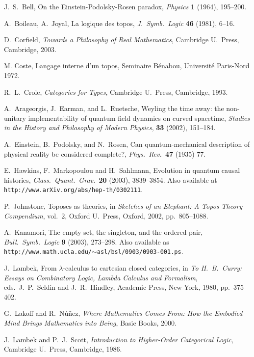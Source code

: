 \documentclass{article}
\begin{document}
\begin{thebibliography}{99}
 J.\ S.\ Bell, On the Einstein-Podolsky-Rosen 
paradox, {\sl Physics} {\bf 1} (1964), 195--200.

 A.\ Boileau, A.\ Joyal, La logique des topos,
{\sl J.\ Symb.\ Logic} {\bf 46} (1981), 6--16.

 D.\ Corfield, {\sl Towards a Philosophy of
Real Mathematics}, Cambridge U.\ Press, Cambridge, 2003.

 M. Coste, Langage interne d'un topos, 
Seminaire B\'enabou, Universit\'e Paris-Nord 1972.

 R.\ L.\ Crole, {\sl Categories for Types}, Cambridge
U.\ Press, Cambridge, 1993.

A.\ Arageorgis, J.\ Earman, and L.\ Ruetsche, 
Weyling the time away: the non-unitary implementability of 
quantum field dynamics on curved spacetime, 
{\sl Studies in the History and Philosophy of Modern Physics}, 
{\bf 33} (2002), 151--184. 

 A.\ Einstein, B.\ Podolsky, and N.\ Rosen, 
Can quantum-mechanical description of physical reality
be considered complete?,  {\sl Phys.\ Rev.\ }{\bf 47} (1935) 77.

 E.\ Hawkins, F.\ Markopoulou and H.\ Sahlmann,
Evolution in quantum causal histories, {\sl Class.\ Quant.\ 
Grav.\ }{\bf 20} (2003), 3839--3854.  Also available at \hfill \break
\texttt{http://www.arXiv.org/abs/hep-th/0302111}.

 P.\ Johnstone, Toposes as theories, in 
{\sl Sketches of an Elephant: A Topos Theory Compendium}, 
vol.\ 2, Oxford U.\ Press, Oxford, 2002, pp.\ 805--1088.

 A.\ Kanamori, The empty set, the singleton,
and the ordered pair, {\sl Bull.\ Symb.\ Logic} {\bf 9} (2003),
273--298.  Also available as
\texttt{http://www.math.ucla.edu/$\sim$asl/bsl/0903/0903-001.ps}. 

 J.\ Lambek, From $\lambda$-calculus to cartesian
closed categories, in {\sl To H.\ B.\ Curry: Essays on Combinatory
Logic, Lambda Calculus and Formalism}, eds.\ J.\ P.\ Seldin and J.\
R.\ Hindley, Academic Press, New York, 1980, pp.\ 375--402. 

G.\ Lakoff and R.\ N\'u\~nez, {\sl Where Mathematics Comes From: 
How the Embodied Mind Brings Mathematics into Being}, Basic Books, 2000. 

\bibitem{LS} J.\ Lambek and P.\ J.\ Scott, {\sl Introduction to
Higher-Order Categorical Logic}, Cambridge U.\ Press, Cambridge,
1986.  


\end{thebibliography}
\end{document}

